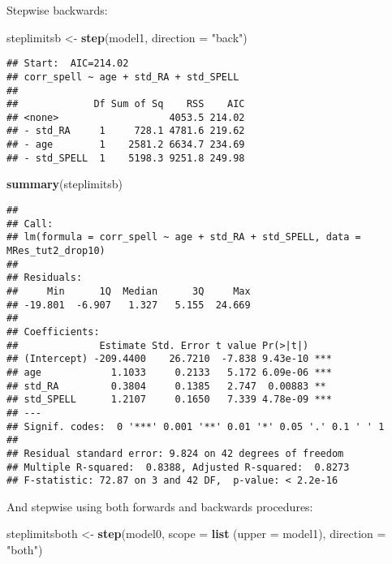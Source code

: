 \documentclass[
]{book}
\newenvironment{Shaded}{\begin{snugshade}}{\end{snugshade}}
\newcommand{\AttributeTok}[1]{\textcolor[rgb]{0.13,0.29,0.53}{#1}}
\newcommand{\FunctionTok}[1]{\textcolor[rgb]{0.13,0.29,0.53}{\textbf{#1}}}
\newcommand{\NormalTok}[1]{#1}
\newcommand{\OtherTok}[1]{\textcolor[rgb]{0.56,0.35,0.01}{#1}}
\newcommand{\StringTok}[1]{\textcolor[rgb]{0.31,0.60,0.02}{#1}}
\begin{document}
Stepwise backwards:

\begin{Shaded}
\begin{Highlighting}[]
\NormalTok{steplimitsb }\OtherTok{\textless{}{-}} \FunctionTok{step}\NormalTok{(model1, }\AttributeTok{direction =} \StringTok{"back"}\NormalTok{)}
\end{Highlighting}
\end{Shaded}

\begin{verbatim}
## Start:  AIC=214.02
## corr_spell ~ age + std_RA + std_SPELL
## 
##             Df Sum of Sq    RSS    AIC
## <none>                   4053.5 214.02
## - std_RA     1     728.1 4781.6 219.62
## - age        1    2581.2 6634.7 234.69
## - std_SPELL  1    5198.3 9251.8 249.98
\end{verbatim}

\begin{Shaded}
\begin{Highlighting}[]
\FunctionTok{summary}\NormalTok{(steplimitsb)}
\end{Highlighting}
\end{Shaded}

\begin{verbatim}
## 
## Call:
## lm(formula = corr_spell ~ age + std_RA + std_SPELL, data = MRes_tut2_drop10)
## 
## Residuals:
##     Min      1Q  Median      3Q     Max 
## -19.801  -6.907   1.327   5.155  24.669 
## 
## Coefficients:
##              Estimate Std. Error t value Pr(>|t|)    
## (Intercept) -209.4400    26.7210  -7.838 9.43e-10 ***
## age            1.1033     0.2133   5.172 6.09e-06 ***
## std_RA         0.3804     0.1385   2.747  0.00883 ** 
## std_SPELL      1.2107     0.1650   7.339 4.78e-09 ***
## ---
## Signif. codes:  0 '***' 0.001 '**' 0.01 '*' 0.05 '.' 0.1 ' ' 1
## 
## Residual standard error: 9.824 on 42 degrees of freedom
## Multiple R-squared:  0.8388, Adjusted R-squared:  0.8273 
## F-statistic: 72.87 on 3 and 42 DF,  p-value: < 2.2e-16
\end{verbatim}

And stepwise using both forwards and backwards procedures:

\begin{Shaded}
\begin{Highlighting}[]
\NormalTok{steplimitsboth }\OtherTok{\textless{}{-}} \FunctionTok{step}\NormalTok{(model0, }\AttributeTok{scope =} \FunctionTok{list}\NormalTok{ (}\AttributeTok{upper =}\NormalTok{ model1), }\AttributeTok{direction =} \StringTok{"both"}\NormalTok{)}
\end{Highlighting}
\end{Shaded}
\end{document}
